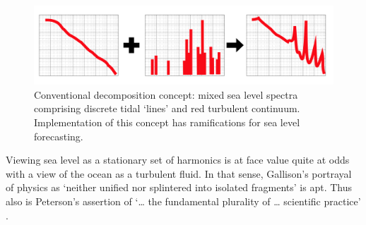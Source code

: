\begin{figure}[h]\centering
  \includegraphics[width=120mm]{figures/diagrams/spectra_cartoon_1.png}
  \caption{Conventional decomposition concept: mixed sea level spectra comprising discrete tidal `lines' and red turbulent continuum.  Implementation of this concept has ramifications for sea level forecasting.}
  \label{fig:SPECTRA_CARTOON}
\end{figure}

Viewing sea level as a stationary set of harmonics is at face value quite at odds with a view of the ocean as a turbulent fluid.   In that sense, Gallison's portrayal of physics as `neither unified nor splintered into isolated fragments' \citep[pp 782]{Galison:1987wh} is apt.  Thus also is Peterson's assertion of `\dots{} the fundamental plurality of \dots{} scientific practice' \cite{Petersen:2012tr}. 
